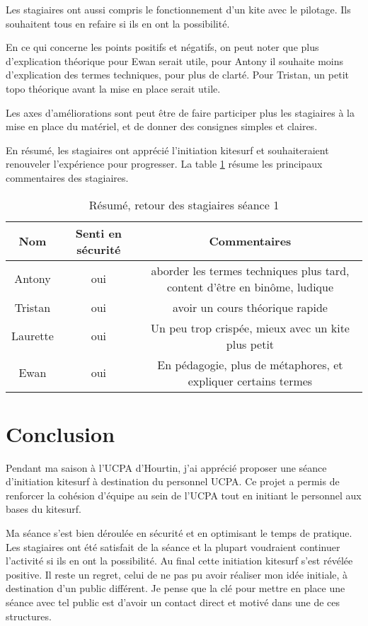 \documentclass[11pt,a4paper]{report}
\begin{document}
Les stagiaires ont aussi compris le fonctionnement d'un kite avec le pilotage.
Ils souhaitent tous en refaire si ils en ont la possibilité.

En ce qui concerne les points positifs et négatifs, on peut noter
que plus d'explication théorique pour Ewan serait utile, pour Antony
il souhaite moins d'explication des termes techniques, pour plus de clarté.
Pour Tristan, un petit topo théorique avant la mise en place serait utile.

Les axes d'améliorations sont peut \^etre de faire participer
plus les stagiaires à la mise en place du matériel, et de
donner des consignes simples et claires. 

En résumé, les stagiaires ont apprécié l'initiation kitesurf et
souhaiteraient renouveler l'expérience pour progresser. La table
\ref{stagiaire_feedback} résume les principaux commentaires des stagiaires.

\begin{table}
\begin{tabular}{|c|c|c|}
        \hline
        \textbf{Nom} & \textbf{Senti en sécurité} & \textbf{Commentaires} \\ 
        \hline
       Antony      &  oui    &  aborder les termes techniques plus tard, content d’être en binôme, ludique         \\
       \hline
       Tristan     &  oui    & avoir un cours théorique rapide  \\
       \hline
        Laurette   &  oui    & Un peu trop crispée, mieux avec un kite plus petit \\
        \hline
        Ewan       &  oui    & En pédagogie, plus de métaphores, et expliquer certains termes\\
        \hline
\end{tabular}
\caption{Résumé, retour des stagiaires séance 1\label{stagiaire_feedback}}
\end{table}


\FloatBarrier
\section{Conclusion}

Pendant ma saison à l'UCPA d'Hourtin, j'ai apprécié proposer une 
séance d'initiation kitesurf à destination du personnel UCPA.
Ce projet a permis de renforcer la cohésion d'équipe au sein de l'UCPA
tout en initiant le personnel aux bases du kitesurf. 

Ma séance s'est bien déroulée en sécurité et en optimisant 
le temps de pratique. Les stagiaires ont été  satisfait de la 
séance et la plupart voudraient continuer l'activité si ils en 
ont la possibilité. 
Au final cette initiation kitesurf s'est révélée  positive.
Il reste un regret, celui de ne pas pu avoir réaliser mon idée initiale, 
à destination d'un public différent. Je pense que la clé pour
mettre en place une séance avec tel public est d'avoir un contact
direct et motivé dans une de ces structures.
\end{document}
